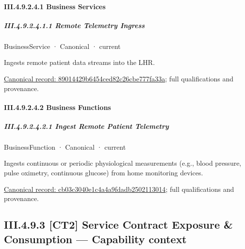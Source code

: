 \paragraph*{III.4.9.2.4.1 Business Services}
\label{navigation:III.4.9.2.4.1}

\subparagraph*{III.4.9.2.4.1.1 Remote Telemetry Ingress}
\label{navigation:III.4.9.2.4.1.1}

\label{element:89014429b6454ced82c26cbe777fa33a}
{\small BusinessService · Canonical · current}\par

Ingests remote patient data streams into the LHR.


{\footnotesize \href{../../../../continuum/business/business-service/89014429b6454ced82c26cbe777fa33a.md}{Canonical record: 89014429b6454ced82c26cbe777fa33a}; full qualifications and provenance.}\par
\paragraph*{III.4.9.2.4.2 Business Functions}
\label{navigation:III.4.9.2.4.2}

\subparagraph*{III.4.9.2.4.2.1 Ingest Remote Patient Telemetry}
\label{navigation:III.4.9.2.4.2.1}

\label{element:cb03c3040e1c4a4a9fdadb2502113014}
{\small BusinessFunction · Canonical · current}\par

Ingests continuous or periodic physiological measurements (e.g., blood pressure, pulse oximetry, continuous glucose) from home monitoring devices.


{\footnotesize \href{../../../../continuum/business/business-function/cb03c3040e1c4a4a9fdadb2502113014.md}{Canonical record: cb03c3040e1c4a4a9fdadb2502113014}; full qualifications and provenance.}\par
\subsection*{III.4.9.3 [CT2] Service Contract Exposure \& Consumption — Capability context}
\label{navigation:III.4.9.3}

